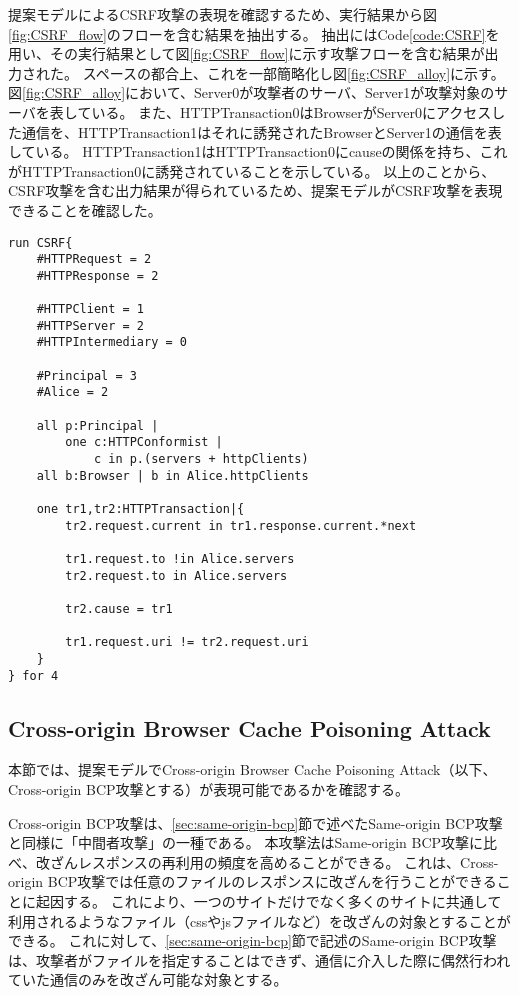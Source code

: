 \documentclass[journal]{IEEEtran}
\begin{document}
提案モデルによるCSRF攻撃の表現を確認するため、実行結果から図\ref{fig:CSRF_flow}のフローを含む結果を抽出する。
抽出にはCode\ref{code:CSRF}を用い、その実行結果として図\ref{fig:CSRF_flow}に示す攻撃フローを含む結果が出力された。
スペースの都合上、これを一部簡略化し図\ref{fig:CSRF_alloy}に示す。
図\ref{fig:CSRF_alloy}において、Server0が攻撃者のサーバ、Server1が攻撃対象のサーバを表している。
また、HTTPTransaction0はBrowserがServer0にアクセスした通信を、HTTPTransaction1はそれに誘発されたBrowserとServer1の通信を表している。
HTTPTransaction1はHTTPTransaction0にcauseの関係を持ち、これがHTTPTransaction0に誘発されていることを示している。
以上のことから、CSRF攻撃を含む出力結果が得られているため、提案モデルがCSRF攻撃を表現できることを確認した。

\begin{lstlisting}[caption=CSRF攻撃の表現, label=code:CSRF]
run CSRF{
	#HTTPRequest = 2
	#HTTPResponse = 2

	#HTTPClient = 1
	#HTTPServer = 2
	#HTTPIntermediary = 0

	#Principal = 3
	#Alice = 2

	all p:Principal |
		one c:HTTPConformist |
			c in p.(servers + httpClients)
	all b:Browser | b in Alice.httpClients

	one tr1,tr2:HTTPTransaction|{
		tr2.request.current in tr1.response.current.*next

		tr1.request.to !in Alice.servers
		tr2.request.to in Alice.servers

		tr2.cause = tr1

		tr1.request.uri != tr2.request.uri
	}
} for 4
\end{lstlisting}


\subsection{Cross-origin Browser Cache Poisoning Attack}
本節では、提案モデルでCross-origin Browser Cache Poisoning Attack\cite{bcpattack}（以下、Cross-origin BCP攻撃とする）が表現可能であるかを確認する。

Cross-origin BCP攻撃は、\ref{sec:same-origin-bcp}節で述べたSame-origin BCP攻撃と同様に「中間者攻撃」の一種である。
本攻撃法はSame-origin BCP攻撃に比べ、改ざんレスポンスの再利用の頻度を高めることができる。
これは、Cross-origin BCP攻撃では任意のファイルのレスポンスに改ざんを行うことができることに起因する。
これにより、一つのサイトだけでなく多くのサイトに共通して利用されるようなファイル（cssやjsファイルなど）を改ざんの対象とすることができる。
これに対して、\ref{sec:same-origin-bcp}節で記述のSame-origin BCP攻撃は、攻撃者がファイルを指定することはできず、通信に介入した際に偶然行われていた通信のみを改ざん可能な対象とする。
\end{document}
